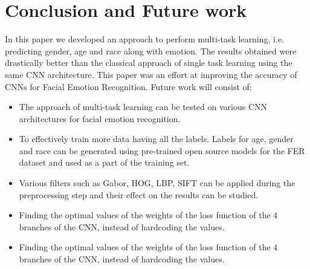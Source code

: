 \documentclass[letterpaper,10pt]{article}
\begin{document}
\section{Conclusion and Future work}
In this paper we developed an approach to perform multi-task learning, i.e. predicting gender, age and race along with emotion. The results obtained were drastically better than the classical approach of single task learning using the same CNN architecture. This paper was an effort at improving the accuracy of CNNs for Facial Emotion  Recognition.
Future work will consist of: 
\begin{itemize}
    \item The approach of multi-task learning can be tested on various CNN architectures for facial emotion recognition.
    \item To effectively train more data having all the labels. Labels for age, gender and race can be generated using pre-trained open source models for the FER dataset and used as a part of the training set.
    \item Various filters such as Gabor, HOG, LBP, SIFT can be applied during the preprocessing step and their effect on the results can be studied.
    \item Finding the optimal values of the weights of the loss function of the 4 branches of the CNN, instead of hardcoding the values.
    \item Finding the optimal values of the weights of the loss function of the 4 branches of the CNN, instead of hardcoding the values.

\end{itemize}
\end{document}
